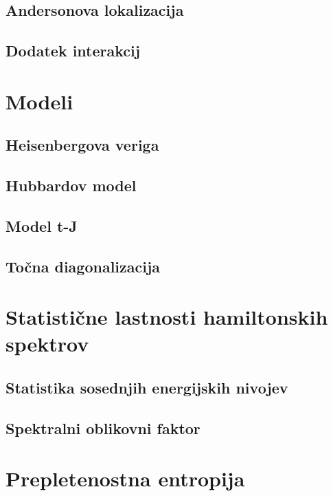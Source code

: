 \documentclass[10pt,a4paper]{article}
\begin{document}
\newpage
%
\subsection{Andersonova lokalizacija}
\subsection{Dodatek interakcij}
\section{Modeli}
\subsection{Heisenbergova veriga}
\subsection{Hubbardov model}
\subsection{Model t-J}
\subsection{Točna diagonalizacija}
\section{Statistične lastnosti hamiltonskih spektrov}
\subsection{Statistika sosednjih energijskih nivojev}
\subsection{Spektralni oblikovni faktor}
\section{Prepletenostna entropija}






\end{document}

